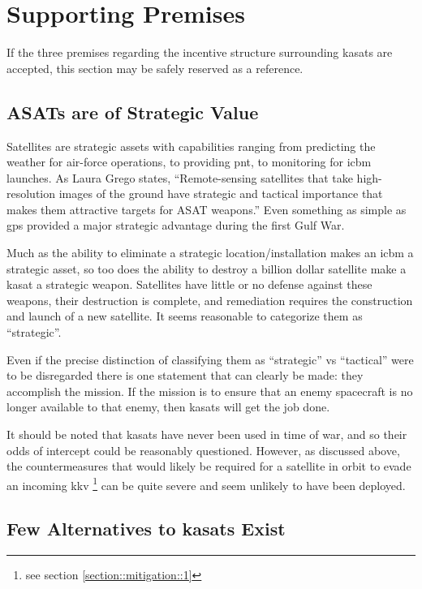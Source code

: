 \section{Supporting Premises}
\label{section::support}

If the three premises regarding the incentive structure surrounding
\acp{kasat} are accepted, this section may be safely reserved as a
reference.

\subsection{ASATs are of Strategic Value}

Satellites are strategic assets with capabilities ranging from
predicting the weather for air-force operations, to providing
\ac{pnt}, to monitoring for \ac{icbm} launches.  As Laura Grego
states, ``Remote-sensing satellites that take high-resolution images
of the ground have strategic and tactical importance that makes them
attractive targets for ASAT weapons.''\cite[p16]{grego} Even something
as simple as \ac{gps} provided a major strategic advantage during the
first Gulf War.\cite{gps-gulf}

Much as the ability to eliminate a strategic location/installation
makes an \ac{icbm} a strategic asset, so too does the ability to
destroy a billion dollar satellite make a \ac{kasat} a strategic
weapon.  Satellites have little or no defense against these weapons,
their destruction is complete, and remediation requires the
construction and launch of a new satellite.  It seems reasonable to
categorize them as ``strategic''.

Even if the precise distinction of classifying them as ``strategic''
vs ``tactical'' were to be disregarded there is one statement that can
clearly be made: they accomplish the mission.  If the mission is to
ensure that an enemy spacecraft is no longer available to that enemy,
then \acp{kasat} will get the job done.

It should be noted that \acp{kasat} have never been used in time of
war\cite{brian}, and so their odds of intercept could be reasonably
questioned.  However, as discussed above, the countermeasures that
would likely be required for a satellite in orbit to evade an incoming
\ac{kkv} \footnote{see section \ref{section::mitigation::1}} can be
quite severe and seem unlikely to have been deployed.

\subsection{Few Alternatives to \acp{kasat} Exist}

